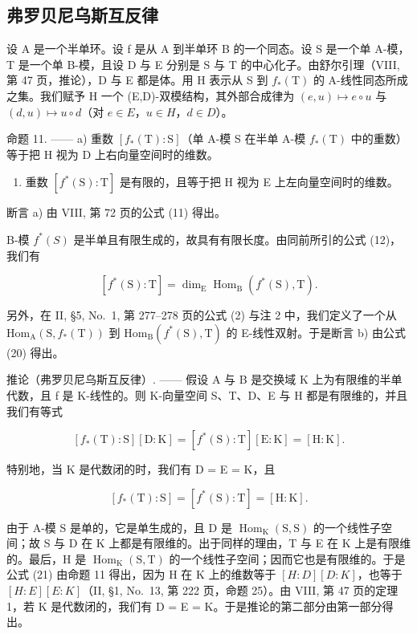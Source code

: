 \subsection{弗罗贝尼乌斯互反律}

设 A 是一个半单环。设 f 是从 A 到半单环 B 的一个同态。设 S 是一个单 A-模，T 是一个单 B-模，且设 D 与 E 分别是 S 与 T 的中心化子。由舒尔引理（VIII, 第 47 页，推论），D 与 E 都是体。用 H 表示从 S 到 \(f_{*}(\mathrm{T})\) 的 A-线性同态所成之集。我们赋予 H 一个 (E,D)-双模结构，其外部合成律为 \((e,u)\mapsto e\circ u\) 与 \((d,u)\mapsto u\circ d\)（对 \(e\in E\)，\(u\in H\)，\(d\in D\)）。

命题 11. —— a) 重数 \([f_{*}(\mathrm{T}):\mathrm{S}]\)（单 A-模 S 在半单 A-模 \(f_{*}(\mathrm{T})\) 中的重数）等于把 H 视为 D 上右向量空间时的维数。

\begin{enumerate}
\def\labelenumi{\alph{enumi})}
\setcounter{enumi}{1}
\tightlist
\item
  重数 \([f^{*}(\mathrm{S}):\mathrm{T}]\) 是有限的，且等于把 H 视为 E 上左向量空间时的维数。
\end{enumerate}

断言 a) 由 VIII, 第 72 页的公式 (11) 得出。

B-模 \(f^{*}(S)\) 是半单且有限生成的，故具有有限长度。由同前所引的公式 (12)，我们有

\[
[ f ^ {*} (\mathrm{S}): \mathrm{T} ] = \dim_ {\mathrm{E}} \operatorname{Hom} _ {\mathrm{B}} (f ^ {*} (\mathrm{S}), \mathrm{T}).\tag{20}
\]

另外，在 II, §5, No.~1, 第 277--278 页的公式 (2) 与注 2 中，我们定义了一个从 \(\mathrm{Hom}_{\mathrm{A}}(\mathrm{S},f_{*}(\mathrm{T}))\) 到 \(\mathrm{Hom}_{\mathrm{B}}(f^{*}(\mathrm{S}),\mathrm{T})\) 的 E-线性双射。于是断言 b) 由公式 (20) 得出。

推论（弗罗贝尼乌斯互反律）. —— 假设 A 与 B 是交换域 K 上为有限维的半单代数，且 f 是 K-线性的。则 K-向量空间 S、T、D、E 与 H 都是有限维的，并且我们有等式

\[
[ f _ {*} (\mathrm{T}): \mathrm{S} ] [ \mathrm{D}: \mathrm{K} ] = [ f ^ {*} (\mathrm{S}): \mathrm{T} ] [ \mathrm{E}: \mathrm{K} ] = [ \mathrm{H}: \mathrm{K} ].\tag{21}
\]

特别地，当 K 是代数闭的时，我们有 D = E = K，且

\[
[ f _ {*} (\mathrm{T}): \mathrm{S} ] = [ f ^ {*} (\mathrm{S}): \mathrm{T} ] = [ \mathrm{H}: \mathrm{K} ].\tag{22}
\]

由于 A-模 S 是单的，它是单生成的，且 D 是 \(\operatorname{Hom}_{\mathrm{K}}(\mathrm{S},\mathrm{S})\) 的一个线性子空间；故 S 与 D 在 K 上都是有限维的。出于同样的理由，T 与 E 在 K 上是有限维的。最后，H 是 \(\operatorname{Hom}_{\mathrm{K}}(\mathrm{S},\mathrm{T})\) 的一个线性子空间；因而它也是有限维的。于是公式 (21) 由命题 11 得出，因为 H 在 K 上的维数等于 \([H:D][D:K]\)，也等于 \([H:E][E:K]\)（II, §1, No.~13, 第 222 页，命题 25）。由 VIII, 第 47 页的定理 1，若 K 是代数闭的，我们有 D = E = K。于是推论的第二部分由第一部分得出。

